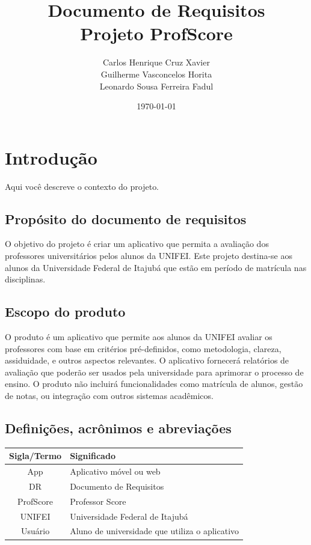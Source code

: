 \documentclass[12pt]{article}
\title{
\textbf{
    Documento de Requisitos  \\
    \vspace{4cm}\huge Projeto ProfScore\vspace{2cm}
}}
\author{
    Carlos Henrique Cruz Xavier \\
    Guilherme Vasconcelos Horita \\ 
    Leonardo Sousa Ferreira Fadul \\ 
    \vspace{4cm}
}
\date{\today}
\begin{document}
\maketitle

\newpage %
\tableofcontents  %

\newpage %
\section{Introdução}
Aqui você descreve o contexto do projeto.

\subsection{Propósito do documento de requisitos}
\hspace{1cm} O objetivo do projeto é criar um aplicativo que permita a avaliação dos
professores universitários pelos alunos da UNIFEI. Este projeto destina-se aos
alunos da Universidade Federal de Itajubá que estão em período de matrícula
nas disciplinas.

\subsection{Escopo do produto}
\hspace{1cm} O produto é um aplicativo que permite aos alunos da UNIFEI avaliar os professores com base em critérios pré-definidos, como metodologia, clareza, assiduidade, e outros aspectos relevantes. O aplicativo fornecerá relatórios de avaliação que poderão ser usados pela universidade para aprimorar o processo de ensino. O produto não incluirá funcionalidades como matrícula de alunos, gestão de notas, ou integração com outros sistemas acadêmicos.

\subsection{Definições, acrônimos e abreviações}
\begin{center}
\begin{tabular}{|c|l|}
\hline
\textbf{Sigla/Termo} & \textbf{Significado} \\
\hline
App & Aplicativo móvel ou web \\
\hline
DR & Documento de Requisitos \\
\hline
ProfScore & Professor Score \\
\hline
UNIFEI & Universidade Federal de Itajubá \\
\hline
Usuário & Aluno de universidade que utiliza o aplicativo \\
\hline
\end{tabular}
\end{center}
\end{document}
